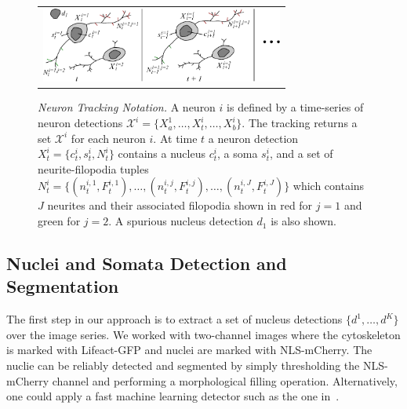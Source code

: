 \begin{figure}[t]
  \begin{center}
       \begin{tabular}{c}
        \includegraphics[width = 80mm] {images/neurondrawing.pdf}\\ [-2.4ex]
       \end{tabular} 
    \caption{  {\footnotesize  {\it Neuron  Tracking  Notation.  }   A
        neuron $i$  is defined by  a time-series of  neuron detections
        $\mathcal{X}^i     =     \{X_{a}^1,\ldots,X_t^i,\ldots,X_{b}^i
        \}$.  The  tracking returns  a  set  $\mathcal{X}^i$ for  each
        neuron $i$.  At time $t$ a neuron detection $X_t^i = \{ c_t^i,
        s_t^i, N_t^i  \}$ contains a nucleus $c_t^i$,  a soma $s_t^i$,
        and    a  set of   neurite-filopodia    tuples    $N_t^i     =    \{(
        n_t^{i,1},F_t^{i,1}),   \ldots,(n_t^{i,j},F_t^{i,j}),  \ldots,
        (n_t^{i,J},F_t^{i,J})  \}$  which  contains $J$  neurites  and
        their associated  filopodia shown in  red for $j=1$  and green
        for  $j=2$. A spurious nucleus  detection  $d_1$ is also shown.}}
    \label{fig:notation}
  \end{center}
\vspace{-9mm}
\end{figure}

\subsection{Nuclei and Somata Detection and Segmentation}
\label{sec:detection}
\vspace{-2mm}
The  first  step in  our  approach  is to  extract  a  set of  nucleus
detections $\{d^1,\ldots,d^K\}$ over the  image series. We worked with
two-channel  images where the  cytoskeleton  is marked  with
Lifeact-GFP and  nuclei   are   marked   with
NLS-mCherry. The nuclie can be reliably detected and segmented
by simply thresholding  the NLS-mCherry channel and performing  a morphological
filling operation.  Alternatively, one could apply
a  fast machine learning detector such  as the  one
in~\cite{Smith09}.


